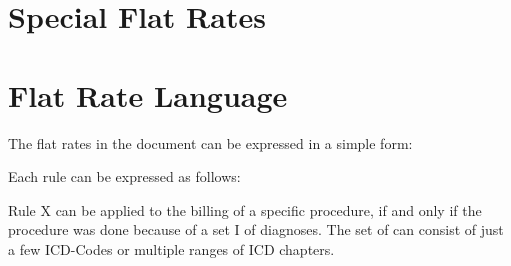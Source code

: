 \section{Special Flat Rates}




\section{Flat Rate Language}

The flat rates in the document can be expressed in a simple form:

Each rule can be expressed as follows:

Rule X can be applied to the billing of a specific procedure, if and only if the procedure was done because of a set I of diagnoses.
The set of can consist of just a few ICD-Codes or multiple ranges of ICD chapters.

